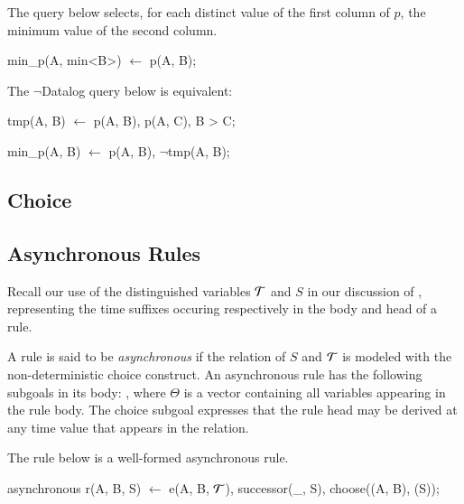 \begin{example}
The query below selects, for each distinct value of the first column of $p$, the minimum 
value of the second column.

\begin{Dedalus}
min_p(A, min<B>) \(\leftarrow\)
  p(A, B);
\end{Dedalus}

The $\lnot$Datalog query below is equivalent:

\begin{Dedalus}

tmp(A, B)  \(\leftarrow\)
  p(A, B),
  p(A, C),
  B > C;
  
min_p(A, B) \(\leftarrow\)
  p(A, B),
  \(\lnot\)tmp(A, B);

\end{Dedalus}
\end{example}






\subsection{Choice}



\subsection{Asynchronous Rules}

Recall our use of the distinguished variables $\Tau$ and $S$ in our discussion of \slang,
representing the time suffixes occuring respectively in the body and head of a rule.

A rule is said to be {\em asynchronous} if the relation of $S$ and
$\Tau$ is modeled with the non-deterministic choice construct.  An asynchronous rule
has the following subgoals in its body: , where $\Theta$ is a vector containing all variables appearing in the
rule body.  The choice subgoal expresses that the rule head may
be derived at any time value that appears in the  relation.

The rule below is a well-formed asynchronous \lang rule.

\begin{Dedalus}
asynchronous
r(A, B, S) \(\leftarrow\)
  e(A, B, \(\Tau\)),
  successor(_, S),
  choose((A, B), (S));
\end{Dedalus}


